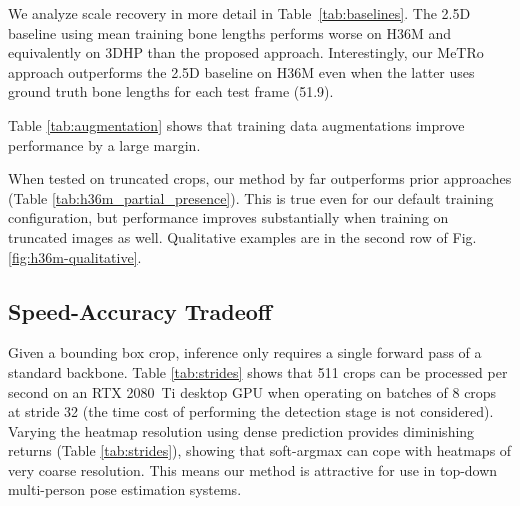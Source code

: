 We analyze scale recovery in more detail in Table~\ref{tab:baselines}.
The 2.5D baseline using mean training bone lengths performs worse on H36M and equivalently on 3DHP than the proposed approach.
Interestingly, our MeTRo approach outperforms the 2.5D baseline on H36M even when the latter uses ground truth bone lengths for each test frame (51.9).

Table \ref{tab:augmentation} shows that training data augmentations improve performance by a large margin.

When tested on truncated crops, our method by far outperforms prior approaches (Table \ref{tab:h36m_partial_presence}).
This is true even for our default training configuration, but performance improves substantially when training on truncated images as well.
Qualitative examples are in the second row of Fig. \ref{fig:h36m-qualitative}.
\subsection{Speed-Accuracy Tradeoff} Given a bounding box crop, inference only requires a single forward pass of a standard backbone.
Table \ref{tab:strides} shows that 511 crops can be processed per second on an RTX 2080~Ti desktop GPU when operating on batches of 8 crops at stride 32 (the time cost of performing the detection stage is not considered).
Varying the heatmap resolution using dense prediction provides diminishing returns (Table \ref{tab:strides}), showing that soft-argmax can cope with heatmaps of very coarse resolution.
This means our method is attractive for use in top-down multi-person pose estimation systems.
